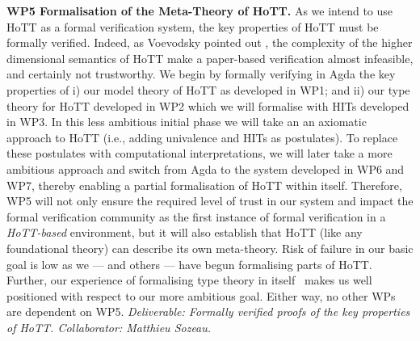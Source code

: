 \documentclass[a4paper,11pt]{article}
\newcommand{\eg}{{e.g.}\ }
\begin{document}
{\bf WP5 Formalisation of the Meta-Theory of HoTT.}  As we intend to use
HoTT as a formal verification system, the key properties of HoTT must
be formally verified. Indeed, as Voevodsky pointed out
\cite{voevodsky-ias14}, the complexity of the higher dimensional
semantics of HoTT make a paper-based verification almost infeasible,
and certainly not trustworthy. We begin by formally verifying in Agda
the key properties of i) our model theory of HoTT as developed in WP1; and
ii) our type theory for HoTT developed in WP2 which we will
formalise with HITs developed in WP3.  In this less ambitious initial
phase we will take an an axiomatic approach to HoTT (i.e., adding
univalence and HITs as postulates). To replace these postulates with
computational interpretations, we will later take a more ambitious
approach and switch from Agda to the system developed in WP6 and WP7,
thereby enabling a partial formalisation of HoTT within itself.
Therefore, WP5 will not only ensure the required level of trust in our
system and impact the formal verification community as the first
instance of formal verification in a {\em HoTT-based} environment, but
it will also establish that HoTT (like any foundational theory) can
describe its own meta-theory. Risk of failure in our basic goal is low
as we --- and others --- have begun formalising parts of HoTT. Further, our
experience of formalising type theory in itself~\cite{easy} makes us well
positioned with respect to our more ambitious goal. Either way, no other WPs are
dependent on WP5. {\em Deliverable: Formally verified proofs of the
key properties of HoTT.  Collaborator: Matthieu Sozeau.  }

\end{document}
